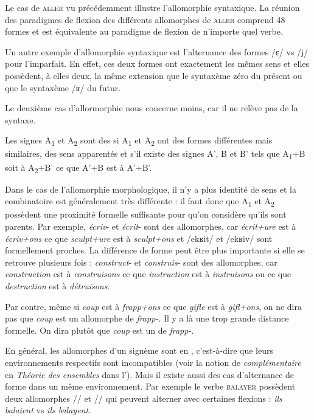 Le cas de \textsc{aller} vu précédemment illustre l’allomorphie syntaxique. La réunion des paradigmes de flexion des différents allomorphes de \textsc{aller} comprend 48 formes et est équivalente au paradigme de flexion de n’importe quel verbe.

Un autre exemple d’allomorphie syntaxique est l’alternance des formes /ɛ/ vs /j/ pour l’imparfait. En effet, ces deux formes ont exactement les mêmes sens et elles possèdent, à elles deux, la même extension que le syntaxème zéro du présent ou que le syntaxème /ʁ/ du futur.

Le deuxième cas d’allormorphie nous concerne moins, car il ne relève pas de la syntaxe.

{Les signes A\textsubscript{1} et A\textsubscript{2} sont des  si A\textsubscript{1} et A\textsubscript{2} ont des formes différentes mais similaires, des sens apparentés et s’il existe des signes A’, B et B’ tels que A\textsubscript{1}+B soit à A\textsubscript{2}+B’ ce que A’+B est à A’+B’.}

Dans le cas de l’allomorphie morphologique, il n’y a plus identité de sens et la combinatoire est généralement très différente : il faut donc que A\textsubscript{1} et A\textsubscript{2} possèdent une proximité formelle suffisante pour qu’on considère qu’ils sont parents. Par exemple, \textit{écriv}{}- et \textit{écrit}{}- sont des allomorphes, car \textit{écrit+ure} est à \textit{écriv+ons} ce que \textit{sculpt+ure} est à \textit{sculpt+ons} et /ekʁit/ et /ekʁiv/ sont formellement proches. La différence de forme peut être plus importante si elle se retrouve plusieurs fois : \textit{construct}{}- et \textit{construis}{}- sont des allomorphes, car \textit{construction} est à \textit{construisons} ce que \textit{instruction} est à \textit{instruisons} ou ce que \textit{destruction} est à \textit{détruisons}.

Par contre, même si \textit{coup} est à \textit{frapp+ons} ce que \textit{gifle} est à \textit{gifl+ons}, on ne dira pas que \textit{coup} est un allomorphe de \textit{frapp-}. Il y a là une trop grande distance formelle. On dira plutôt que \textit{coup} est un  de \textit{frapp-}.

En général, les allomorphes d’un signème sont en , c’est-à-dire que leurs environnements respectifs sont incompatibles (voir la notion de \textit{complémentaire} en \textit{Théorie des ensembles} dans l'). Mais il existe aussi des cas d’alternance de forme dans un même environnement. Par exemple le verbe \textsc{balayer} possèdent deux allomorphes // et // qui peuvent alterner avec certaines flexions : \textit{ils balaient} vs \textit{ils balayent}.


